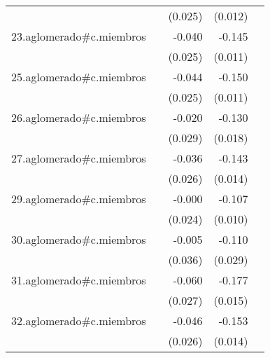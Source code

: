 {\begin{longtable}{l*{4}{D{.}{.}{-1}}}
            &                     &     (0.025)         &     (0.012)         &                     \\
\addlinespace
23.aglomerado#c.miembros&                     &      -0.040         &      -0.145\sym{***}&                     \\
            &                     &     (0.025)         &     (0.011)         &                     \\
\addlinespace
25.aglomerado#c.miembros&                     &      -0.044         &      -0.150\sym{***}&                     \\
            &                     &     (0.025)         &     (0.011)         &                     \\
\addlinespace
26.aglomerado#c.miembros&                     &      -0.020         &      -0.130\sym{***}&                     \\
            &                     &     (0.029)         &     (0.018)         &                     \\
\addlinespace
27.aglomerado#c.miembros&                     &      -0.036         &      -0.143\sym{***}&                     \\
            &                     &     (0.026)         &     (0.014)         &                     \\
\addlinespace
29.aglomerado#c.miembros&                     &      -0.000         &      -0.107\sym{***}&                     \\
            &                     &     (0.024)         &     (0.010)         &                     \\
\addlinespace
30.aglomerado#c.miembros&                     &      -0.005         &      -0.110\sym{***}&                     \\
            &                     &     (0.036)         &     (0.029)         &                     \\
\addlinespace
31.aglomerado#c.miembros&                     &      -0.060\sym{*}  &      -0.177\sym{***}&                     \\
            &                     &     (0.027)         &     (0.015)         &                     \\
\addlinespace
32.aglomerado#c.miembros&                     &      -0.046         &      -0.153\sym{***}&                     \\
            &                     &     (0.026)         &     (0.014)         &                     \\

\end{longtable}}
